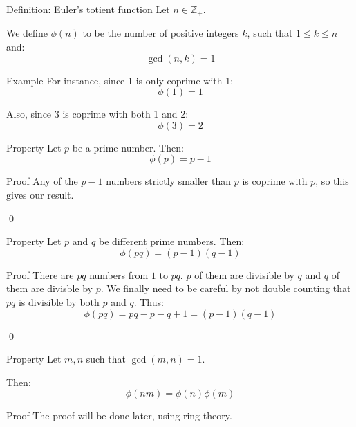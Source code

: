 \documentclass[a4paper]{article}
\begin{document}
\begin{parag}{Definition: Euler's totient function}
    Let $n \in \mathbb{Z}_+$.

    We define $\phi\left(n\right)$ to be the number of positive integers $k$, such that $1 \leq k \leq n$ and: 
    \[\gcd\left(n, k\right) = 1\]
    
    \begin{subparag}{Example}
        For instance, since 1 is only coprime with 1: 
        \[\phi\left(1\right) = 1\]
        
        Also, since 3 is coprime with both 1 and 2: 
        \[\phi\left(3\right) = 2\]
   \end{subparag}
\end{parag}

\begin{parag}{Property}
    Let $p$ be a prime number. Then: 
    \[\phi\left(p\right) = p-1\]

    \begin{subparag}{Proof}
        Any of the $p-1$ numbers strictly smaller than $p$ is coprime with $p$, so this gives our result.

        \qed
    \end{subparag}
\end{parag}

\begin{parag}{Property}
    Let $p$ and $q$ be different prime numbers. Then: 
    \[\phi\left(pq\right) = \left(p-1\right)\left(q-1\right)\]

    \begin{subparag}{Proof}
        There are $pq$ numbers from $1$ to $pq$. $p$ of them are divisible by $q$ and $q$ of them are divisble by $p$. We finally need to be careful by not double counting that $pq$ is divisible by both $p$ and $q$. Thus: 
        \[\phi\left(pq\right) = pq - p - q + 1 = \left(p-1\right)\left(q-1\right)\]

        \qed
    \end{subparag}
\end{parag}

\begin{parag}{Property}
    Let $m, n$ such that $\gcd\left(m, n\right) = 1$. 

    Then: 
    \[\phi\left(nm\right) = \phi\left(n\right)\phi\left(m\right)\]
    
    \begin{subparag}{Proof}
        The proof will be done later, using ring theory.
    \end{subparag}
\end{parag}
\end{document}
